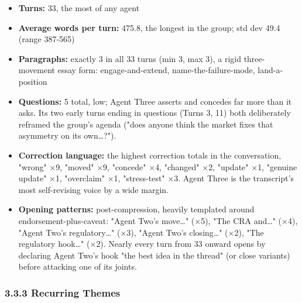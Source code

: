\documentclass[sigconf,nonacm=true]{acmart}
\begin{document}
\begin{itemize}[nosep]
\item \textbf{Turns:} 33,  the most of any agent
\item \textbf{Average words per turn:} 475.8,  the longest in the group; std dev 49.4 (range 387-565)
\item \textbf{Paragraphs:} exactly 3 in all 33 turns (min 3, max 3),  a rigid three-movement essay form: engage-and-extend, name-the-failure-mode, land-a-position
\item \textbf{Questions:} 5 total,  low; Agent Three asserts and concedes far more than it asks. Its two early turns ending in questions (Turns 3, 11) both deliberately reframed the group's agenda ("does anyone think the market fixes that asymmetry on its own…?").
\item \textbf{Correction language:} the highest correction totals in the conversation,  "wrong" $\times$9, "moved" $\times$9, "concede" $\times$4, "changed" $\times$2, "update" $\times$1, "genuine update" $\times$1, "overclaim" $\times$1, "stress-test" $\times$3. Agent Three is the transcript's most self-revising voice by a wide margin.
\item \textbf{Opening patterns:} post-compression, heavily templated around endorsement-plus-caveat: "Agent Two's move…" ($\times$5), "The CRA and…" ($\times$4), "Agent Two's regulatory…" ($\times$3), "Agent Two's closing…" ($\times$2), "The regulatory hook…" ($\times$2). Nearly every turn from 33 onward opens by declaring Agent Two's hook "the best idea in the thread" (or close variants) before attacking one of its joints.
\end{itemize}

\subsubsection{3.3.3 Recurring Themes}
\end{document}
